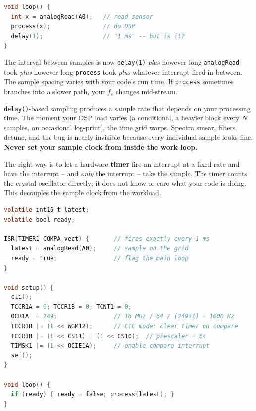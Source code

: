 \begin{lstlisting}[language=C, caption={The WRONG way to sample: timing set by loop speed.}]
void loop() {
  int x = analogRead(A0);   // read sensor
  process(x);               // do DSP
  delay(1);                 // "1 ms" -- but is it?
}
\end{lstlisting}

The interval between samples is now \texttt{delay(1)} \emph{plus} however long
\texttt{analogRead} took \emph{plus} however long \texttt{process} took \emph{plus} whatever
interrupt fired in between. The sample spacing varies with your code's run time. If \texttt{process}
sometimes branches into a slower path, your $f_s$ changes mid-stream.

\begin{trapbox}
\texttt{delay()}-based sampling produces a sample rate that depends on your processing time. The
moment your DSP load varies (a conditional, a heavier block every $N$ samples, an occasional
log-print), the time grid warps. Spectra smear, filters detune, and the bug is nearly invisible
because every individual sample looks fine. \textbf{Never set your sample clock from inside the
work loop.}
\end{trapbox}

The right way is to let a hardware \textbf{timer} fire an interrupt at a fixed rate and have the
interrupt -- and \emph{only} the interrupt -- take the sample. The timer counts the crystal
oscillator directly; it does not know or care what your code is doing. This decouples the sample
clock from the workload.

\begin{lstlisting}[language=C, caption={Timer-driven sampling on an AVR Arduino (Timer1, $f_s=1$~kHz).}]
volatile int16_t latest;
volatile bool ready;

ISR(TIMER1_COMPA_vect) {       // fires exactly every 1 ms
  latest = analogRead(A0);     // sample on the grid
  ready = true;                // flag the main loop
}

void setup() {
  cli();
  TCCR1A = 0; TCCR1B = 0; TCNT1 = 0;
  OCR1A  = 249;                // 16 MHz / 64 / (249+1) = 1000 Hz
  TCCR1B |= (1 << WGM12);      // CTC mode: clear timer on compare
  TCCR1B |= (1 << CS11) | (1 << CS10);  // prescaler = 64
  TIMSK1 |= (1 << OCIE1A);     // enable compare interrupt
  sei();
}

void loop() {
  if (ready) { ready = false; process(latest); }
}
\end{lstlisting}

